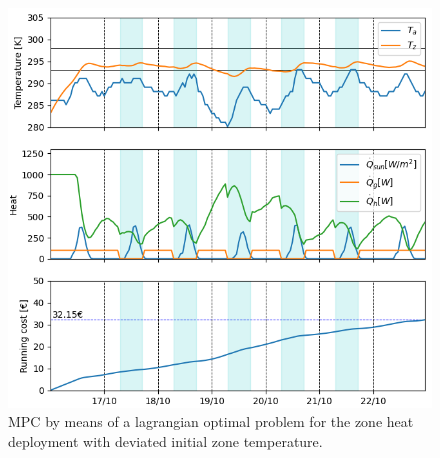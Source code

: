 \begin{figure}[H]
\centering
\includegraphics[scale=0.8]{images/mpc_lagrangian_Tstart.png}
\caption{MPC by means of a lagrangian optimal problem for the zone heat deployment with deviated initial zone temperature.}
\label{fig:mpc_lagrangian_Tstart}
\end{figure}